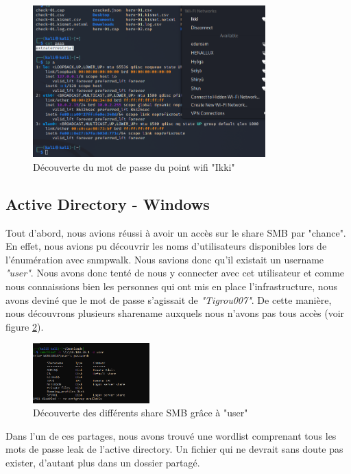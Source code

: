 \documentclass[a4paper]{article}
\begin{document}
\begin{figure}[H]
    \centering
    \includegraphics[width=0.8\textwidth]{images/lab4/WIFICRACKED.PNG}
    \caption{Découverte du mot de passe du point wifi "Ikki"}
    \label{fig:wifi}
\end{figure}




\subsection{Active Directory - Windows}\label{sec:wordlist}

Tout d'abord, nous avions réussi à avoir un accès sur le share SMB par "chance". En effet, nous avions pu découvrir les noms d'utilisateurs disponibles lors de l'énumération avec snmpwalk. Nous savions donc qu'il existait un username \emph{"user"}. Nous avons donc tenté de nous y connecter avec cet utilisateur et comme nous connaissions bien les personnes qui ont mis en place l'infrastructure, nous avons deviné que le mot de passe s'agissait de \emph{"Tigrou007"}. De cette manière, nous découvrons plusieurs sharename auxquels nous n'avons pas tous accès (voir figure \ref{fig:smbuser}).

\begin{figure}[H]
    \centering
    \includegraphics[width=0.4\textwidth]{images/lab4/smbuser.PNG}
    \caption{Découverte des différents share SMB grâce à "user"}
    \label{fig:smbuser}
\end{figure}

Dans l'un de ces partages, nous avons trouvé une wordlist comprenant tous les mots de passe leak de l'active directory. Un fichier qui ne devrait sans doute pas exister, d'autant plus dans un dossier partagé.
\end{document}
